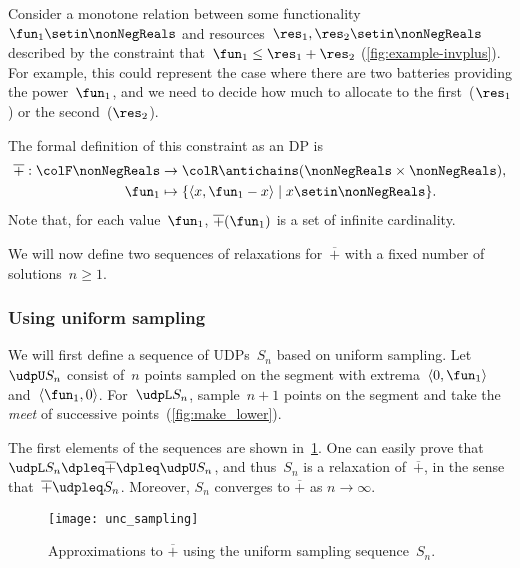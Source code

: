 Consider a monotone relation between some functionality~$\fun_{1}\setin\nonNegReals$
and resources~$\res_{1},\res_{2}\setin\nonNegReals$ described by
the constraint that~$\fun_{1}\leq\res_{1}+\res_{2}$ (\cref{fig:example-invplus}).
For example, this could represent the case where there are two batteries
providing the power~$\fun_{1}$, and we need to decide how much to
allocate to the first~($\res_{1}$) or the second~($\res_{2}$).


The formal definition of this constraint as an DP is
\begin{align*}
    \overline{+}:{\colF\nonNegReals} & \rightarrow{\colR\antichains(\nonNegReals\times\nonNegReals)}, \\
    \fun_{1}                         & \mapsto\{\left\langle x,\fun_{1}-x\right\rangle \mid x\setin\nonNegReals\}.
\end{align*}
Note that, for each value~$\fun_{1}$, $\overline{+}(\fun_{1})$
is a set of infinite cardinality.

We will now define two sequences of relaxations for~$\overline{+}$
with a fixed number of solutions~$n\geq1$.

\subsubsection*{Using uniform sampling}

We will first define a sequence of UDPs~$S_{n}$ based on uniform
sampling.
Let~$\udpU S_{n}$ consist of~$n$ points sampled on the
segment with extrema~$\left\langle 0,\fun_{1}\right\rangle $ and~$\left\langle \fun_{1},0\right\rangle $.
For~$\udpL S_{n}$, sample~$n+1$ points on the segment and take
the \emph{meet} of successive points~(\cref{fig:make_lower}).
\begin{center}
    \par
\end{center}

The first elements of the sequences are shown in~\cref{fig:approx_invplus}.
One can easily prove that $\udpL S_{n}\dpleq\overline{+}\dpleq\udpU S_{n}$,
and thus~$S_{n}$ is a relaxation of~$\overline{+}$, in the sense
that~$\overline{+}\udpleq S_{n}$.
Moreover, $S_{n}$ converges to
$\overline{+}$ as $n\rightarrow\infty$.

\begin{figure}[h]
    \centering
    \texttt{[image: unc\_sampling]}
    \caption{Approximations to $\overline{+}$ using
        the uniform sampling sequence~$S_{n}$. }
    \label{fig:approx_invplus}
\end{figure}

